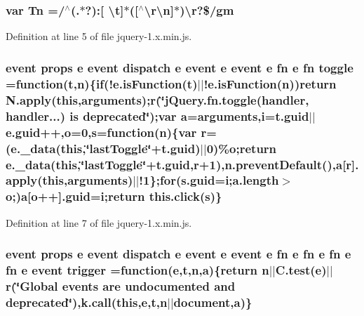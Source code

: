 \subsubsection[{\texorpdfstring{Tn}{Tn}}]{\setlength{\rightskip}{0pt plus 5cm}var Tn =/$^\wedge$(.$\ast$?)\+:\mbox{[} \textbackslash{}{\bf t}\mbox{]}$\ast$(\mbox{[}$^\wedge$\textbackslash{}{\bf r\textbackslash{}n}\mbox{]}$\ast$)\textbackslash{}r?\$/gm}\hypertarget{jquery-1_8x_8min_8js_a2a743fa90b7bc233019c5b720ccde5cc}{}\label{jquery-1_8x_8min_8js_a2a743fa90b7bc233019c5b720ccde5cc}


Definition at line 5 of file jquery-\/1.\+x.\+min.\+js.

\subsubsection[{\texorpdfstring{toggle}{toggle}}]{ event props {\bf e} event dispatch {\bf e} event {\bf e} event {\bf e} {\bf fn} {\bf e} {\bf fn} toggle =function({\bf t},{\bf n})\{{\bf if}(!e.\+is\+Function({\bf t})$\vert$$\vert$!e.\+is\+Function({\bf n}))return N.\+apply({\bf this},arguments);r(\char`\"{}j\+Query.\+fn.\+toggle(handler, handler...) is deprecated\char`\"{});var {\bf a}=arguments,{\bf i}=t.\+guid$\vert$$\vert$e.\+guid++,{\bf o}=0,{\bf s}=function({\bf n})\{var r=(e.\+\_\+data({\bf this},\char`\"{}last\+Toggle\char`\"{}+t.\+guid)$\vert$$\vert$0)\%{\bf o};return e.\+\_\+data({\bf this},\char`\"{}last\+Toggle\char`\"{}+t.\+guid,r+1),n.\+prevent\+Default(),{\bf a}\mbox{[}r\mbox{]}.apply({\bf this},arguments)$\vert$$\vert$!1\};{\bf for}(s.\+guid={\bf i};{\bf a.\+length}$>${\bf o};){\bf a}\mbox{[}{\bf o}++\mbox{]}.guid={\bf i};return {\bf this.\+click}({\bf s})\}}\hypertarget{jquery-1_8x_8min_8js_a43180668e085e3412510ad16aea975b3}{}\label{jquery-1_8x_8min_8js_a43180668e085e3412510ad16aea975b3}


Definition at line 7 of file jquery-\/1.\+x.\+min.\+js.

\subsubsection[{\texorpdfstring{trigger}{trigger}}]{ event props {\bf e} event dispatch {\bf e} event {\bf e} event {\bf e} {\bf fn} {\bf e} {\bf fn} {\bf e} {\bf fn} {\bf e} {\bf fn} {\bf e} event trigger =function({\bf e},{\bf t},{\bf n},{\bf a})\{return {\bf n}$\vert$$\vert$C.\+test({\bf e})$\vert$$\vert$r(\char`\"{}Global events are undocumented and deprecated\char`\"{}),k.\+call({\bf this},{\bf e},{\bf t},{\bf n}$\vert$$\vert${\bf document},{\bf a})\}}\hypertarget{jquery-1_8x_8min_8js_a239df7e8c2edd1a4de69f6e2752cf667}{}\label{jquery-1_8x_8min_8js_a239df7e8c2edd1a4de69f6e2752cf667}


